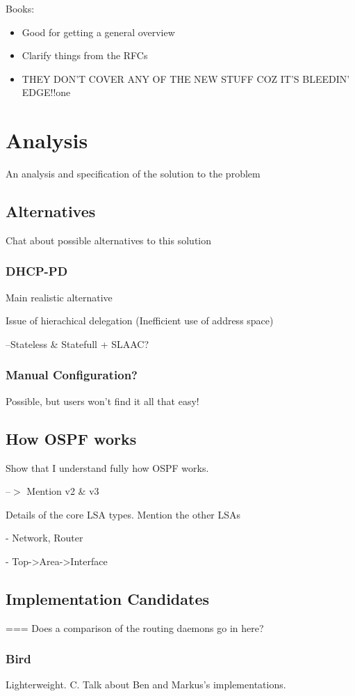 \documentclass[12pt]{report}
\begin{document}
Books:

\begin{itemize}
\item Good for getting a general overview
\item Clarify things from the RFCs 
\item THEY DON'T COVER ANY OF THE NEW STUFF COZ IT'S BLEEDIN' EDGE!!one
\end{itemize}

\chapter{Analysis}
An analysis and specification of the solution to the problem

\section{Alternatives}
Chat about possible alternatives to this solution

\subsection{DHCP-PD}
Main realistic alternative

Issue of hierachical delegation (Inefficient use of address space)

--Stateless \& Statefull + SLAAC?

\subsection{Manual Configuration?}
Possible, but users won't find it all that easy!

\section{How OSPF works}
Show that I understand fully how OSPF works. 

--$>$ Mention v2 \& v3

Details of the core LSA types. Mention the other LSAs

- Network, Router 

- Top->Area->Interface

\section{Implementation Candidates}
=== Does a comparison of the routing daemons go in here?

\subsection{Bird}
Lighterweight. C. Talk about Ben and Markus's implementations.
\end{document}
